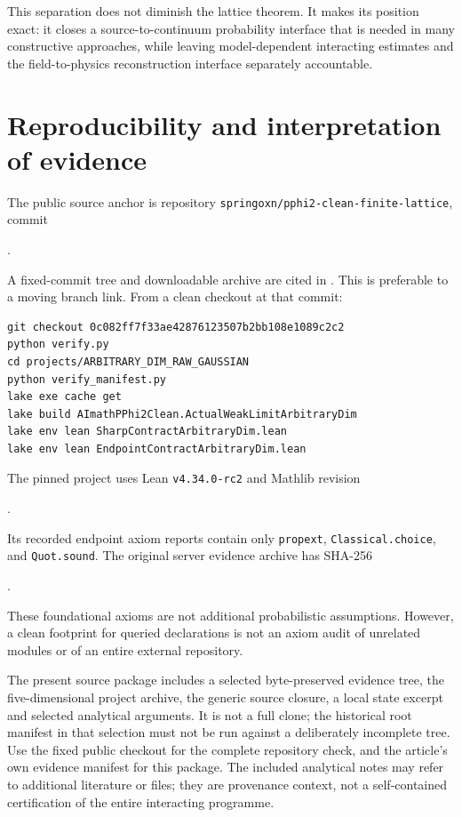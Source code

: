 \documentclass[11pt]{amsart}
\theoremstyle{remark}\newtheorem{remark}[theorem]{Remark}
\begin{document}
This separation does not diminish the lattice theorem. It makes its position exact: it closes a source-to-continuum probability interface that is needed in many constructive approaches, while leaving model-dependent interacting estimates and the field-to-physics reconstruction interface separately accountable.

\section{Reproducibility and interpretation of evidence}\label{sec:reproduce}
The public source anchor is repository \texttt{springoxn/pphi2-clean-finite-lattice}, commit
\begin{center}.\end{center}
A fixed-commit tree and downloadable archive are cited in \cite{Release}. This is preferable to a moving branch link. From a clean checkout at that commit:
\begin{verbatim}
git checkout 0c082ff7f33ae42876123507b2bb108e1089c2c2
python verify.py
cd projects/ARBITRARY_DIM_RAW_GAUSSIAN
python verify_manifest.py
lake exe cache get
lake build AImathPPhi2Clean.ActualWeakLimitArbitraryDim
lake env lean SharpContractArbitraryDim.lean
lake env lean EndpointContractArbitraryDim.lean
\end{verbatim}
The pinned project uses Lean \texttt{v4.34.0-rc2} and Mathlib revision
\begin{center}.\end{center}
Its recorded endpoint axiom reports contain only \texttt{propext}, \texttt{Classical.choice}, and \texttt{Quot.sound}. The original server evidence archive has SHA-256
\begin{center}\small{}.\end{center}
These foundational axioms are not additional probabilistic assumptions. However, a clean footprint for queried declarations is not an axiom audit of unrelated modules or of an entire external repository.

The present source package includes a selected byte-preserved evidence tree, the five-dimensional project archive, the generic source closure, a local state excerpt and selected analytical arguments. It is not a full clone; the historical root manifest in that selection must not be run against a deliberately incomplete tree. Use the fixed public checkout for the complete repository check, and the article's own evidence manifest for this package. The included analytical notes may refer to additional literature or files; they are provenance context, not a self-contained certification of the entire interacting programme.
\end{document}
